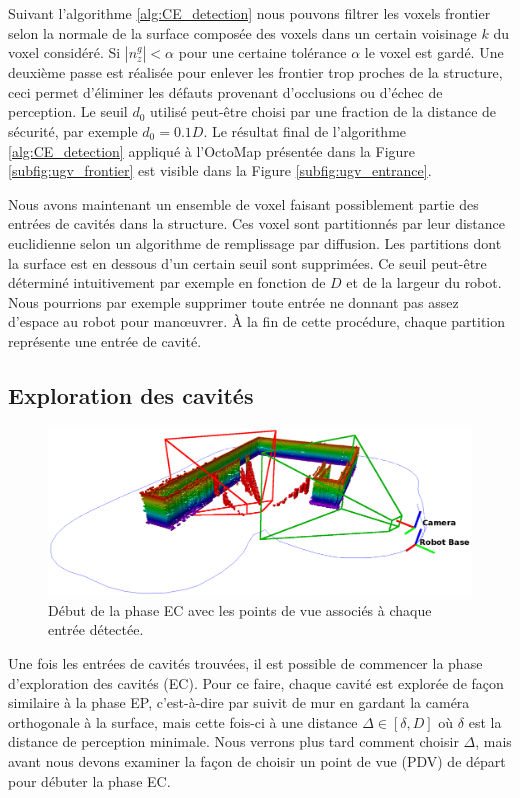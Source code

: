 Suivant l'algorithme \ref{alg:CE_detection} nous pouvons filtrer les voxels frontier selon la normale de la surface composée des voxels dans un certain voisinage $k$ du voxel considéré. Si $| n_z^g | < \alpha$ pour une certaine tolérance $\alpha$ le voxel est gardé. Une deuxième passe est réalisée pour enlever les frontier trop proches de la structure, ceci permet d'éliminer les défauts provenant d'occlusions ou d'échec de perception. Le seuil $d_0$ utilisé peut-être choisi par une fraction de la distance de sécurité, par exemple $d_0 = 0.1D$. Le résultat final de l'algorithme \ref{alg:CE_detection} appliqué à l'OctoMap présentée dans la Figure \ref{subfig:ugv_frontier} est visible dans la Figure \ref{subfig:ugv_entrance}.

Nous avons maintenant un ensemble de voxel faisant possiblement partie des entrées de cavités dans la structure. Ces voxel sont partitionnés par leur distance euclidienne selon un algorithme de remplissage par diffusion. Les partitions dont la surface est en dessous d'un certain seuil sont supprimées. Ce seuil peut-être déterminé intuitivement par exemple en fonction de $D$ et de la largeur du robot. Nous pourrions par exemple supprimer toute entrée ne donnant pas assez d'espace au robot pour man{\oe}uvrer. À la fin de cette procédure, chaque partition représente une entrée de cavité.

\subsection{Exploration des cavités}

\begin{figure}[ht]
  \centering
  \includegraphics[width=0.8\linewidth]{images/CE_start}
  \caption{Début de la phase EC avec les points de vue associés à chaque entrée détectée.}
  \label{ugv:debut_ec}
\end{figure}

Une fois les entrées de cavités trouvées, il est possible de commencer la phase d'exploration des cavités (EC). Pour ce faire, chaque cavité est explorée de façon similaire à la phase EP, c'est-à-dire par suivit de mur en gardant la caméra orthogonale à la surface, mais cette fois-ci à une distance $\Delta \in [\delta, D]$ où $\delta$ est la distance de perception minimale. Nous verrons plus tard comment choisir $\Delta$, mais avant nous devons examiner la façon de choisir un point de vue (PDV) de départ pour débuter la phase EC.

